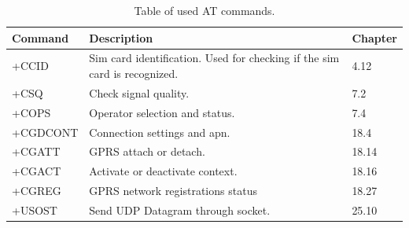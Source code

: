 \begin{table}[H]
	\begin{tabularx}{\textwidth}{l X X}
		\toprule
		Command & Description & Chapter \\
		\midrule
		+CCID & Sim card identification. Used for checking if the sim card is recognized. & 4.12 \\
		+CSQ & Check signal quality. & 7.2 \\
		+COPS & Operator selection and status. & 7.4 \\
		+CGDCONT & Connection settings and apn. & 18.4 \\
		+CGATT & GPRS attach or detach. & 18.14 \\
		+CGACT & Activate or deactivate context. & 18.16 \\
		+CGREG & GPRS network registrations status & 18.27 \\
		+USOST & Send UDP Datagram through socket. & 25.10 \\
		\bottomrule
	\end{tabularx}
	\caption{Table of used AT commands.}
	\label{tab:ATcomm}
\end{table}

\FloatBarrier
